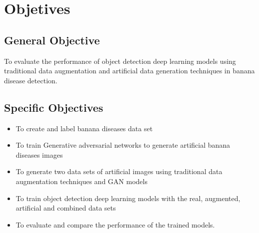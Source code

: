 \chapter{Objetives} %
\label{Chapter4}

\section{General Objective} 
To evaluate the performance of object detection deep learning models using traditional data augmentation and artificial data generation techniques in banana disease detection. 
\section{Specific Objectives} 
\begin{itemize} 
\item To create and label banana diseases data set
\item To train Generative adversarial networks to generate artificial banana diseases images
\item To generate two data sets of artificial images using traditional data augmentation techniques and GAN models
\item To train object detection deep learning models with the real, augmented, artificial and combined data sets
\item To evaluate and compare the performance of the trained models.
\end{itemize}   